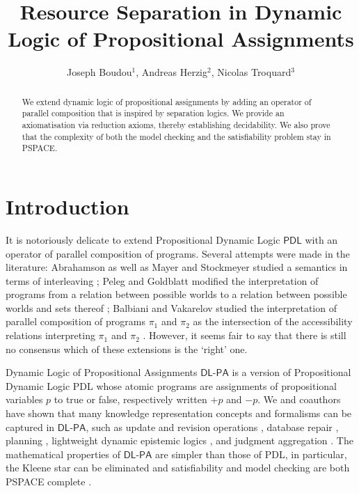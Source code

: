 \documentclass{llncs}
\title{Resource Separation in Dynamic Logic of Propositional Assignments }
\author{Joseph Boudou$^1$, Andreas Herzig$^2$, Nicolas Troquard$^3$}
\institute{
  IRIT, University of Toulouse, France \and
  IRIT, CNRS, France \and
  Free University of Bozen-Bolzano, Italy 
}
\newcommand{\Dlpa}{\ensuremath{\mathsf{DL\text{-}PA}}\xspace}
\newcommand{\Pdl}{\ensuremath{\mathsf{PDL}}\xspace}
\newcommand{\assgntop}[1]{{\mathtt {+} #1}}
\newcommand{\assgnbot}[1]{{\mathtt {-} #1}}
\begin{document}
\maketitle

\begin{abstract}
We extend dynamic logic of propositional assignments by adding an operator of parallel composition that is inspired by separation logics. 
We provide an axiomatisation via reduction axioms, thereby establishing decidability. 
We also prove that the complexity of both the model checking and the satisfiability problem stay in PSPACE.
\end{abstract}


\section{Introduction}

It is notoriously delicate to extend Propositional Dynamic Logic \Pdl with an operator of parallel composition of programs. 
Several attempts were made in the literature:
Abrahamson as well as Mayer and Stockmeyer studied a semantics in terms of interleaving \cite{Abrahamson80,MayerS96}; 
Peleg and Goldblatt modified the interpretation of programs from a relation between possible worlds to a relation between
possible worlds and sets thereof \cite{Peleg87,Goldblatt92}; 
Balbiani and Vakarelov studied the interpretation of parallel composition of programs $\pi_1$ and $\pi_2$ as 
the intersection of the accessibility relations interpreting $\pi_1$ and $\pi_2$ \cite{BalbianiV03}. 
However, it seems fair to say that there is still no consensus which of these extensions is the `right' one. 

Dynamic Logic of Propositional Assignments \Dlpa \cite{BalbianiHerzigTroquard-Lics13,BalbianiHST14} 
is a version of Propositional Dynamic Logic PDL whose atomic programs are 
assignments of propositional variables $p$ to true or false, respectively written $\assgntop p$ and $\assgnbot p$. 
We and coauthors have shown that many knowledge representation concepts and formalisms can be captured in \Dlpa, such as 
update and revision operations \cite{Herzig-Kr14}, 
database %
repair 
\cite{%
FeuilladeHR19}, 
planning \cite{HerzigEtal-Ecai14,HerzigEtal-Ijcai19},
lightweight dynamic epistemic logics \cite{DBLP:conf/atal/CharrierS15,CooperHMMR16,DBLP:conf/atal/CharrierS17}, and
judgment aggregation \cite{DBLP:journals/logcom/NovaroGH18}. 
The mathematical properties of \Dlpa are simpler than those of PDL, in particular, 
the Kleene star can be eliminated \cite{BalbianiHerzigTroquard-Lics13} and 
satisfiability and model checking are both PSPACE complete \cite{BalbianiHST14}. 
\end{document}
